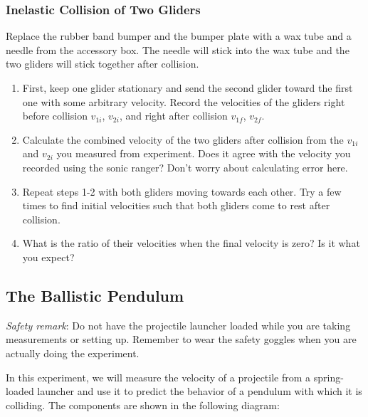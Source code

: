 \subsubsection{Inelastic Collision of Two Gliders}

Replace the rubber band bumper and the bumper plate with a wax tube and a needle from the accessory box. The needle will stick into the wax tube and the two gliders will stick together after collision.
\begin{enumerate}
  \item First, keep one glider stationary and send the second glider toward the first one with some arbitrary velocity. Record the velocities of the gliders right before collision $v_{1i}$, $v_{2i}$, and right after collision $v_{1f}$, $v_{2f}$.
  \item Calculate the combined velocity of the two gliders after collision from the $v_{1i}$ and $v_{2i}$ you measured from experiment. Does it agree with the velocity you recorded using the sonic ranger? Don't worry about calculating error here.
  \item Repeat  steps 1-2 with both gliders moving towards each other. Try a few times to find initial velocities such that both gliders come to rest after collision.
  \item What is the ratio of their velocities when the final velocity is zero? Is it what you expect?
\end{enumerate}

\subsection{The Ballistic Pendulum}
\emph{Safety remark}: Do not have the projectile launcher loaded while you are taking measurements or setting up. Remember to wear the safety goggles when you are actually doing the experiment.\myskip

In this experiment, we will measure the velocity of a projectile from a spring-loaded launcher and use it to predict the behavior of a pendulum with which it is colliding. The components are shown in the following diagram:


